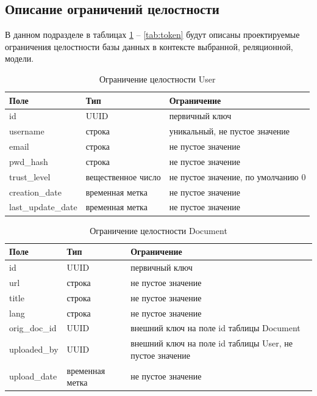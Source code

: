 \subsection{Описание ограничений целостности}

В данном подразделе в таблицах \ref{tab:user} -- \ref{tab:token} будут описаны проектируемые ограничения целостности базы данных в контексте выбранной, реляционной, модели.

\begin{table}[H]
\centering
\caption{Ограничение целостности User}
\begin{tabular}{|m{4cm}|m{3cm}|m{6cm}|}
\hline
\textbf{Поле} & \textbf{Тип} & \textbf{Ограничение} \\ \hline
id & UUID & первичный ключ \\ \hline
username & строка & уникальный, не пустое значение \\ \hline
email & строка & не пустое значение \\ \hline
pwd\_hash & строка & не пустое значение \\ \hline
trust\_level & вещественное число & не пустое значение, по умолчанию 0 \\ \hline
creation\_date & временная метка & не пустое значение \\ \hline
last\_update\_date & временная метка & не пустое значение \\ \hline
\end{tabular}
\label{tab:user}
\end{table}

\begin{table}[H]
\centering
\caption{Ограничение целостности Document}
\begin{tabular}{|m{3cm}|m{3cm}|m{6cm}|}
\hline
\textbf{Поле} & \textbf{Тип} & \textbf{Ограничение} \\ \hline
id & UUID & первичный ключ \\ \hline
url & строка & не пустое значение \\ \hline
title & строка & не пустое значение \\ \hline
lang & строка & не пустое значение \\ \hline
orig\_doc\_id & UUID & внешний ключ на поле id таблицы Document \\ \hline
uploaded\_by & UUID & внешний ключ на поле id таблицы User, не пустое значение \\ \hline
upload\_date & временная метка & не пустое значение \\ \hline
\end{tabular}
\label{tab:doc}
\end{table}

